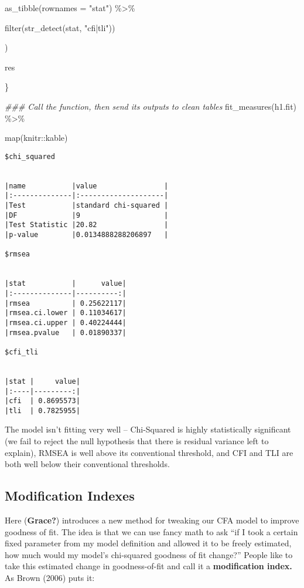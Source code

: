 \documentclass[
  letterpaper,
  DIV=11,
  numbers=noendperiod]{scrreprt}
\newenvironment{Shaded}{\begin{snugshade}}{\end{snugshade}}
\newcommand{\AttributeTok}[1]{\textcolor[rgb]{0.40,0.45,0.13}{#1}}
\newcommand{\DocumentationTok}[1]{\textcolor[rgb]{0.37,0.37,0.37}{\textit{#1}}}
\newcommand{\FunctionTok}[1]{\textcolor[rgb]{0.28,0.35,0.67}{#1}}
\newcommand{\NormalTok}[1]{\textcolor[rgb]{0.00,0.23,0.31}{#1}}
\newcommand{\SpecialCharTok}[1]{\textcolor[rgb]{0.37,0.37,0.37}{#1}}
\newcommand{\StringTok}[1]{\textcolor[rgb]{0.13,0.47,0.30}{#1}}
\begin{document}
\begin{Shaded}
\begin{Highlighting}[]
      \FunctionTok{as\_tibble}\NormalTok{(}\AttributeTok{rownames =} \StringTok{"stat"}\NormalTok{) }\SpecialCharTok{\%\textgreater{}\%} 
      
      \FunctionTok{filter}\NormalTok{(}\FunctionTok{str\_detect}\NormalTok{(stat, }\StringTok{"cfi|tli"}\NormalTok{)) }
    
\NormalTok{  )}
  
\NormalTok{  res}
  
\NormalTok{\}}

\DocumentationTok{\#\#\# Call the function, then send its outputs to clean tables}
\FunctionTok{fit\_measures}\NormalTok{(h1.fit) }\SpecialCharTok{\%\textgreater{}\%} 
  
  \FunctionTok{map}\NormalTok{(knitr}\SpecialCharTok{::}\NormalTok{kable)}
\end{Highlighting}
\end{Shaded}

\begin{verbatim}
$chi_squared


|name           |value                |
|:--------------|:--------------------|
|Test           |standard chi-squared |
|DF             |9                    |
|Test Statistic |20.82                |
|p-value        |0.0134888288206897   |

$rmsea


|stat           |      value|
|:--------------|----------:|
|rmsea          | 0.25622117|
|rmsea.ci.lower | 0.11034617|
|rmsea.ci.upper | 0.40224444|
|rmsea.pvalue   | 0.01890337|

$cfi_tli


|stat |     value|
|:----|---------:|
|cfi  | 0.8695573|
|tli  | 0.7825955|
\end{verbatim}

The model isn't fitting very well -- Chi-Squared is highly statistically
significant (we fail to reject the null hypothesis that there is
residual variance left to explain), RMSEA is well above its conventional
threshold, and CFI and TLI are both well below their conventional
thresholds.

\hypertarget{modification-indexes}{%
\subsection{Modification Indexes}\label{modification-indexes}}

Here (\textbf{Grace?}) introduces a new method for tweaking our CFA
model to improve goodness of fit. The idea is that we can use fancy math
to ask ``if I took a certain fixed parameter from my model definition
and allowed it to be freely estimated, how much would my model's
chi-squared goodness of fit change?'' People like to take this estimated
change in goodness-of-fit and call it a \textbf{modification index.} As
Brown (2006) puts it:
\end{document}
